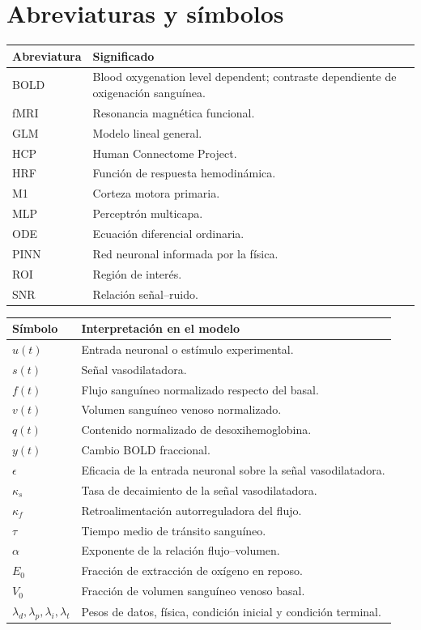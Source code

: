 \chapter*{Abreviaturas y símbolos}

\begin{longtable}{p{}p{}}
\toprule
\textbf{Abreviatura} & \textbf{Significado} \\
\midrule
BOLD & Blood oxygenation level dependent; contraste dependiente de oxigenación sanguínea. \\
fMRI & Resonancia magnética funcional. \\
GLM & Modelo lineal general. \\
HCP & Human Connectome Project. \\
HRF & Función de respuesta hemodinámica. \\
M1 & Corteza motora primaria. \\
MLP & Perceptrón multicapa. \\
ODE & Ecuación diferencial ordinaria. \\
PINN & Red neuronal informada por la física. \\
ROI & Región de interés. \\
SNR & Relación señal--ruido. \\
\bottomrule
\end{longtable}

\begin{longtable}{p{}p{}}
\toprule
\textbf{Símbolo} & \textbf{Interpretación en el modelo} \\
\midrule
$u(t)$ & Entrada neuronal o estímulo experimental. \\
$s(t)$ & Señal vasodilatadora. \\
$f(t)$ & Flujo sanguíneo normalizado respecto del basal. \\
$v(t)$ & Volumen sanguíneo venoso normalizado. \\
$q(t)$ & Contenido normalizado de desoxihemoglobina. \\
$y(t)$ & Cambio BOLD fraccional. \\
$\epsilon$ & Eficacia de la entrada neuronal sobre la señal vasodilatadora. \\
$\kappa_s$ & Tasa de decaimiento de la señal vasodilatadora. \\
$\kappa_f$ & Retroalimentación autorreguladora del flujo. \\
$\tau$ & Tiempo medio de tránsito sanguíneo. \\
$\alpha$ & Exponente de la relación flujo--volumen. \\
$E_0$ & Fracción de extracción de oxígeno en reposo. \\
$V_0$ & Fracción de volumen sanguíneo venoso basal. \\
$\lambda_d,\lambda_p,\lambda_i,\lambda_t$ & Pesos de datos, física, condición inicial y condición terminal. \\
\bottomrule
\end{longtable}
